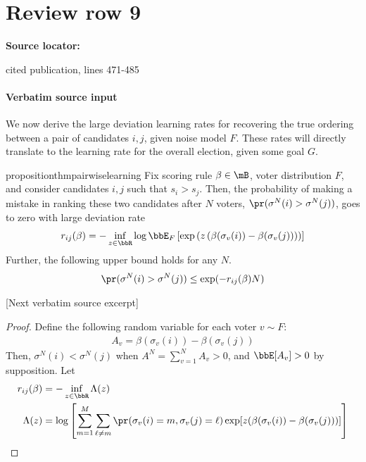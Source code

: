 \documentclass[10pt]{article}
\begin{document}
\section*{Review row 9}
\textbf{Source locator:} {\footnotesize\raggedright cited publication, lines 471-\allowbreak{}485\par}
\paragraph{Verbatim source input}
\begin{ReviewVerbatim}
 We now derive the large deviation learning rates for recovering the true ordering between a pair of candidates $i,j$, given noise model $F$. These rates will directly translate to the learning rate for the overall election, given some goal $G$.


%

\begin{restatable}{proposition}{thmpairwiselearning}
	\label{thm:pairwiselearning}
	Fix scoring rule $\beta\in\mB$, voter distribution $F$, and consider candidates $i,j$ such that $s_i > s_j$. Then, the probability of making a mistake in ranking these two candidates after $N$ voters, $\pr(\sigma^N(i)>\sigma^N(j))$, goes to zero with large deviation rate
	\[r_{ij}(\beta) = -\inf_{z\in\bbR} \log \bbE_F\left[\exp\left(z\left(\beta(\sigma_v(i)) - \beta(\sigma_v(j))\right)\right)\right]\]
	Further, the following upper bound holds for any $N$.
	\[\pr(\sigma^N(i)>\sigma^N(j)) \leq \exp(-r_{ij}(\beta)N)\]
%
%
%
\end{restatable}

[Next verbatim source excerpt]

\thmpairwiselearning*
\begin{proof}

	Define the following random variable for each voter $v \sim F$:
	\begin{align*}
	A_v = \beta(\sigma_v(i)) - \beta(\sigma_v(j))
	\end{align*}
	Then, $\sigma^N(i) < \sigma^N(j)$ when $A^N = \sum_{v=1}^N A_v > 0$, and $\bbE[A_v]>0$ by supposition.
	Let
	\begin{align*}
		r_{ij}(\beta) &= -\inf_{z\in\bbR}{\Lambda(z)}\\
	\Lambda(z) &= \log \left[\sum_{m=1}^M \sum_{\ell\neq m} \pr(\sigma_v(i) = m, \sigma_v(j)=\ell) \exp[ z(\beta(\sigma_v(i)) - \beta(\sigma_v(j)))]   \right]
	\end{align*}


\end{proof}
\end{ReviewVerbatim}
\end{document}
